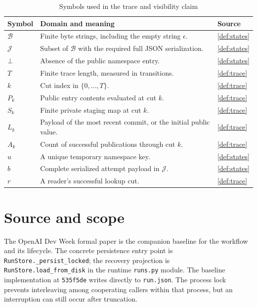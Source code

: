 \documentclass[12pt]{article}
\newcommand{\Bytes}{\mathcal{B}}
\newcommand{\Valid}{\mathcal{J}}
\newcommand{\absent}{\bot}
\begin{document}
\begin{table}[!htbp]
\centering\small
\caption{Symbols used in the trace and visibility claim}
\label{tab:symbols}
\begin{tabularx}{\linewidth}{@{}lX l@{}}
\toprule
Symbol & Domain and meaning & Source \\
\midrule
$\Bytes$ & Finite byte strings, including the empty string $\epsilon$. & \ref{def:states} \\
$\Valid$ & Subset of $\Bytes$ with the required full JSON serialization. & \ref{def:states} \\
$\absent$ & Absence of the public namespace entry. & \ref{def:states} \\
$T$ & Finite trace length, measured in transitions. & \ref{def:trace} \\
$k$ & Cut index in $\{0,\ldots,T\}$. & \ref{def:trace} \\
$P_k$ & Public entry contents evaluated at cut $k$. & \ref{def:trace} \\
$S_k$ & Finite private staging map at cut $k$. & \ref{def:trace} \\
$L_k$ & Payload of the most recent commit, or the initial public value. & \ref{def:trace} \\
$A_k$ & Count of successful publications through cut $k$. & \ref{def:trace} \\
$u$ & A unique temporary namespace key. & \ref{def:states} \\
$b$ & Complete serialized attempt payload in $\Valid$. & \ref{def:states} \\
$r$ & A reader's successful lookup cut. & \ref{def:trace} \\
\bottomrule
\end{tabularx}
\end{table}
\clearpage
\tableofcontents
\listoftables
\clearpage

\section{Source and scope}
\label{sec:source}
The OpenAI Dev Week formal paper is the companion baseline for the
workflow and its lifecycle. The concrete persistence entry point is
\texttt{RunStore.\allowbreak\_persist\_locked}; the recovery projection is
\texttt{RunStore.\allowbreak load\_from\_disk} in the runtime
\texttt{runs.py} module. The baseline implementation at
\texttt{535f5de} writes directly to \texttt{run.json}. The process lock
prevents interleaving among cooperating callers within that process,
but an interruption can still occur after truncation.
\end{document}
